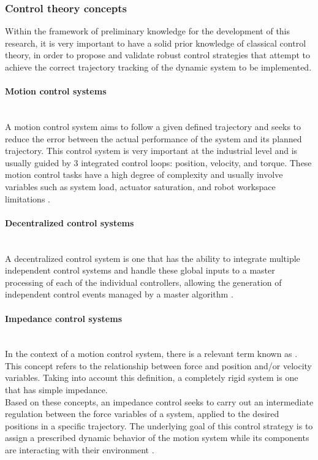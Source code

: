 \documentclass[11pt]{report} %
\newcommand{\subsubsubsection}[1]{\paragraph{#1}\mbox{}\\}
\begin{document}
\subsubsection{Control theory concepts}

Within the framework of preliminary knowledge for the development of this research, it is very important to have a solid prior knowledge of classical control theory, in order to propose and validate robust control strategies that attempt to achieve the correct trajectory tracking of the dynamic system to be implemented.\\

\subsubsubsection{Motion control systems}

A motion control system aims to follow a given defined trajectory and seeks to reduce the error between the actual performance of the system and its planned trajectory. This control system is very important at the industrial level and is usually guided by 3 integrated control loops: position, velocity, and torque. These motion control tasks have a high degree of complexity and usually involve variables such as system load, actuator saturation, and robot workspace limitations \citep{cite_position_control_for_linear_motion_servo_systems}.\\

\subsubsubsection{Decentralized control systems}

A decentralized control system is one that has the ability to integrate multiple independent control systems and handle these global inputs to a master processing of each of the individual controllers, allowing the generation of independent control events managed by a master algorithm \citep{cite_centralized_control_systems_book}.\\

\subsubsubsection{Impedance control systems}

In the context of a motion control system, there is a relevant term known as . This concept refers to the relationship between force and position and/or velocity variables. Taking into account this definition, a completely rigid system is one that has simple impedance.\\

Based on these concepts, an impedance control seeks to carry out an intermediate regulation between the force variables of a system, applied to the desired positions in a specific trajectory. The underlying goal of this control strategy is to assign a prescribed dynamic behavior of the motion system while its components are interacting with their environment \citep{cite_canudas_theory_of_robotic_control}.\\
\end{document}
